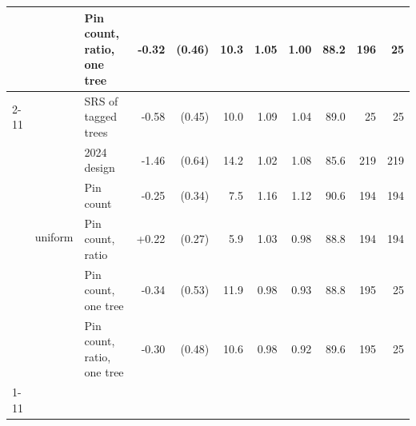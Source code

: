 \begin{tabular}{lll|rr|r|rr|r|rr}
 &  & Pin count, ratio, one tree & -0.32 & (0.46) & 10.3 & 1.05 & 1.00 & 88.2 & 196 & 25 \\
\cline{2-11}
 & \multirow[t]{6}{*}{uniform} & SRS of tagged trees & -0.58 & (0.45) & 10.0 & 1.09 & 1.04 & 89.0 & 25 & 25 \\
 &  & 2024 design & -1.46 & (0.64) & 14.2 & 1.02 & 1.08 & 85.6 & 219 & 219 \\
 &  & Pin count & -0.25 & (0.34) & 7.5 & 1.16 & 1.12 & 90.6 & 194 & 194 \\
 &  & Pin count, ratio & +0.22 & (0.27) & 5.9 & 1.03 & 0.98 & 88.8 & 194 & 194 \\
 &  & Pin count, one tree & -0.34 & (0.53) & 11.9 & 0.98 & 0.93 & 88.8 & 195 & 25 \\
 &  & Pin count, ratio, one tree & -0.30 & (0.48) & 10.6 & 0.98 & 0.92 & 89.6 & 195 & 25 \\
\cline{1-11} \cline{2-11}
\bottomrule
\end{tabular}
